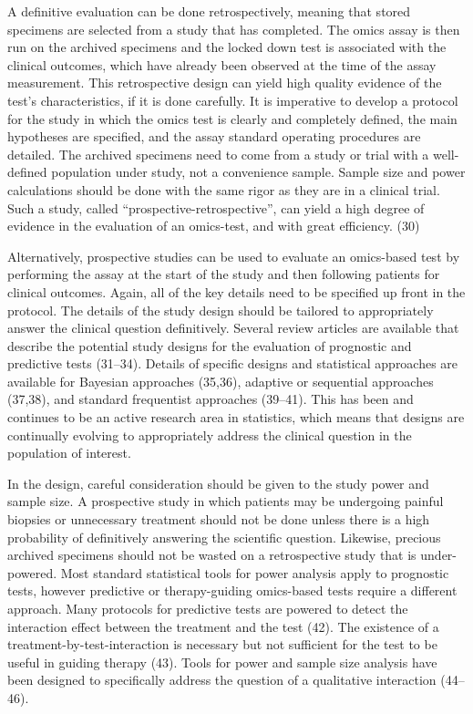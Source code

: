 \documentclass[11pt]{article}
\begin{document}
A definitive evaluation can be done retrospectively, meaning that stored
specimens are selected from a study that has completed. The omics assay
is then run on the archived specimens and the locked down test is
associated with the clinical outcomes, which have already been observed
at the time of the assay measurement. This retrospective design can
yield high quality evidence of the test's characteristics, if it is done
carefully. It is imperative to develop a protocol for the study in which
the omics test is clearly and completely defined, the main hypotheses
are specified, and the assay standard operating procedures are detailed.
The archived specimens need to come from a study or trial with a
well-defined population under study, not a convenience sample. Sample
size and power calculations should be done with the same rigor as they
are in a clinical trial. Such a study, called
``prospective-retrospective'', can yield a high degree of evidence in
the evaluation of an omics-test, and with great efficiency. (30)

Alternatively, prospective studies can be used to evaluate an
omics-based test by performing the assay at the start of the study and
then following patients for clinical outcomes. Again, all of the key
details need to be specified up front in the protocol. The details of
the study design should be tailored to appropriately answer the clinical
question definitively. Several review articles are available that
describe the potential study designs for the evaluation of prognostic
and predictive tests (31--34). Details of specific designs and
statistical approaches are available for Bayesian approaches (35,36),
adaptive or sequential approaches (37,38), and standard frequentist
approaches (39--41). This has been and continues to be an active
research area in statistics, which means that designs are continually
evolving to appropriately address the clinical question in the
population of interest.

In the design, careful consideration should be given to the study power
and sample size. A prospective study in which patients may be undergoing
painful biopsies or unnecessary treatment should not be done unless
there is a high probability of definitively answering the scientific
question. Likewise, precious archived specimens should not be wasted on
a retrospective study that is under-powered. Most standard statistical
tools for power analysis apply to prognostic tests, however predictive
or therapy-guiding omics-based tests require a different approach. Many
protocols for predictive tests are powered to detect the interaction
effect between the treatment and the test (42). The existence of a
treatment-by-test-interaction is necessary but not sufficient for the
test to be useful in guiding therapy (43). Tools for power and sample
size analysis have been designed to specifically address the question of
a qualitative interaction (44--46).
\end{document}
